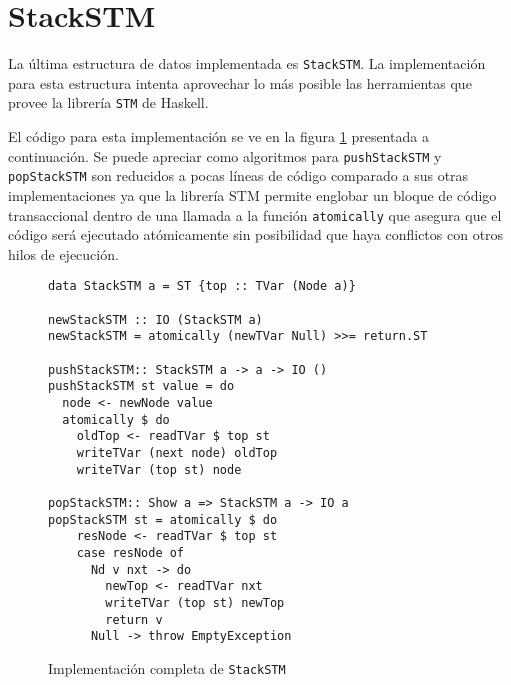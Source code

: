 \clearpage
\section{StackSTM}
La última estructura de datos implementada es \texttt{StackSTM}. La implementación para esta estructura intenta aprovechar lo más posible las herramientas que provee la librería \texttt{STM} de Haskell.

El código para esta implementación se ve en la figura \ref{fig:stack-stm} presentada a continuación. Se puede apreciar como algoritmos para \texttt{pushStackSTM} y \texttt{popStackSTM} son reducidos a pocas líneas de código comparado a sus otras implementaciones ya que la librería STM permite englobar un bloque de código transaccional dentro de una llamada a la función \texttt{atomically} que asegura que el código será ejecutado atómicamente sin posibilidad que haya conflictos con otros hilos de ejecución.

\begin{figure}[H]
  \centering
  \begin{verbatim}
data StackSTM a = ST {top :: TVar (Node a)}

newStackSTM :: IO (StackSTM a)
newStackSTM = atomically (newTVar Null) >>= return.ST

pushStackSTM:: StackSTM a -> a -> IO ()
pushStackSTM st value = do
  node <- newNode value
  atomically $ do
    oldTop <- readTVar $ top st
    writeTVar (next node) oldTop
    writeTVar (top st) node

popStackSTM:: Show a => StackSTM a -> IO a
popStackSTM st = atomically $ do
    resNode <- readTVar $ top st
    case resNode of
      Nd v nxt -> do
        newTop <- readTVar nxt
        writeTVar (top st) newTop
        return v
      Null -> throw EmptyException   
  \end{verbatim}
  \caption{Implementación completa de \texttt{StackSTM}}
  \label{fig:stack-stm}
\end{figure}